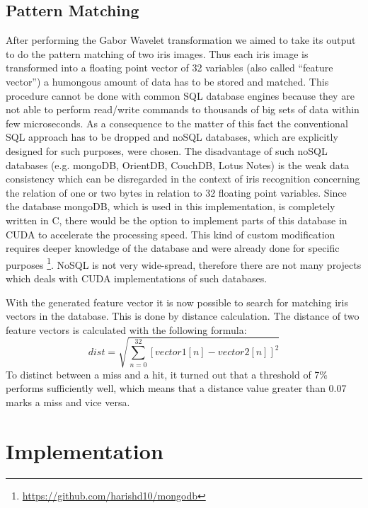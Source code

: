 \documentclass[journal]{IEEEtran}
\begin{document}
\subsection{Pattern Matching}

After performing the Gabor Wavelet transformation we aimed to take its output to do the pattern matching of two iris images. Thus each iris image is transformed into a floating point vector of 32 variables (also called “feature vector”) a humongous amount of data has to be stored and matched. This procedure cannot be done with common SQL database engines because they are not able to perform read/write commands to thousands of big sets of data within few  microseconds. As a consequence to the matter of this fact the conventional SQL approach has to be dropped and noSQL databases, which are explicitly designed for such purposes, were chosen. The disadvantage of such noSQL databases (e.g. mongoDB, OrientDB, CouchDB, Lotus Notes) is the weak data consistency which can be disregarded in the context of iris recognition concerning the relation of one or two bytes in relation to 32 floating point variables. Since the database mongoDB, which is used in this implementation, is completely written in C, there would be the option to implement parts of this database in CUDA to accelerate the processing speed. This kind of custom modification requires deeper knowledge of the database and were already done for specific purposes \footnote{\url{https://github.com/harishd10/mongodb}}. NoSQL is not very wide-spread, therefore there are not many projects which deals with CUDA implementations of such databases.
\par With the generated feature vector it is now possible to search for matching iris vectors in the database. This is done by distance calculation. The distance of two feature vectors is calculated with the following formula:
\[
dist = \sqrt{\sum_{n=0}^{32}{[vector1[n]-vector2[n]]}^2}
\]
To distinct between a miss and a hit, it turned out that a threshold of 7\% performs sufficiently well, which means that a distance value greater than 0.07 marks a miss and vice versa.

\section{Implementation}
\end{document}
